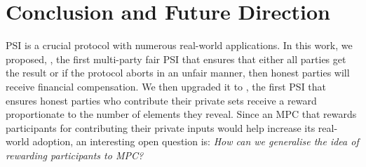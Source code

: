 


\svs
\vs

\section{Conclusion and Future Direction}\label{sec::concl}

\svs

PSI is a crucial protocol with numerous real-world applications. In this work, we proposed, \withFai, the first multi-party fair PSI that ensures that either all parties get the result or if the protocol aborts in an unfair manner, then honest parties will receive financial compensation. We then upgraded it to \withRew, the first PSI that ensures honest parties who contribute their private sets receive a reward proportionate to the number of elements they reveal. Since an MPC that rewards participants for contributing their private inputs would help increase its real-world adoption, an interesting open question is: 
%
 \emph{How can we generalise the idea of rewarding participants to MPC?}

\svs
\vs